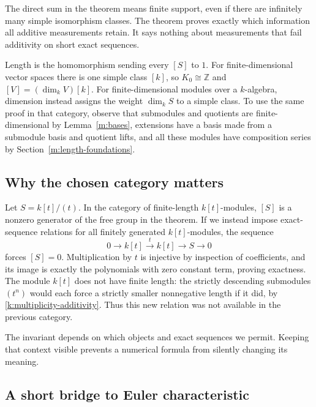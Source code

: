 \documentclass[11pt]{article}
\theoremstyle{definition}
\theoremstyle{remark}\newtheorem{remark}[theorem]{Remark}
\begin{document}
The direct sum in the theorem means finite support, even if there are
infinitely many simple isomorphism classes. The theorem proves exactly
which information all additive measurements retain. It says nothing
about measurements that fail additivity on short exact sequences.

Length is the homomorphism sending every $[S]$ to $1$. For
finite-dimensional vector spaces there is one simple class $[k]$,
so $K_0\cong\mathbb Z$ and $[V]=(\dim_kV)[k]$.
For finite-dimensional modules over a $k$-algebra, dimension instead
assigns the weight $\dim_k S$ to a simple class. To use the same proof
in that category, observe that submodules and quotients are finite-dimensional
by Lemma~\ref{m:bases}, extensions have a basis made from a submodule
basis and quotient lifts, and all these modules have composition series
by Section~\ref{m:length-foundations}.

\subsection{Why the chosen category matters}

Let $S=k[t]/(t)$. In the category of finite-length $k[t]$-modules,
$[S]$ is a nonzero generator of the free group in the theorem.
If we instead impose exact-sequence relations for all finitely generated
$k[t]$-modules, the sequence
\[
0\longrightarrow k[t]\xrightarrow{\,t\,}k[t]
\longrightarrow S\longrightarrow0
\]
forces $[S]=0$. Multiplication by $t$ is injective by inspection of
coefficients, and its image is exactly the polynomials with zero
constant term, proving exactness. The module $k[t]$ does not have
finite length: the strictly descending submodules $(t^n)$ would each
force a strictly smaller nonnegative length if it did, by
\eqref{k:multiplicity-additivity}. Thus this new relation was not
available in the previous category.

The invariant depends on which objects and exact sequences we permit.
Keeping that context visible prevents a numerical formula from
silently changing its meaning.

\subsection{A short bridge to Euler characteristic}
\label{k:euler}
\end{document}
